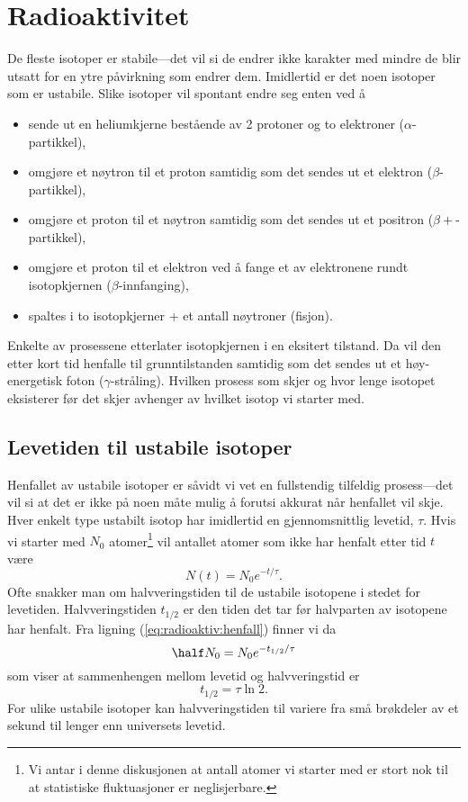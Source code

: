 \chapter{Radioaktivitet}
De fleste isotoper er stabile---det vil si de endrer ikke karakter med mindre de blir utsatt for en ytre påvirkning som endrer dem. Imidlertid er det noen isotoper som er ustabile. Slike isotoper vil spontant endre seg enten ved å
\begin{itemize}
\item
sende ut en heliumkjerne bestående av 2 protoner og to elektroner ($\alpha$-partikkel),
\item
omgjøre et nøytron til et proton samtidig som det sendes ut et elektron ($\beta$-partikkel),
\item
omgjøre et proton til et nøytron samtidig som det sendes ut et positron ($\beta+$-partikkel),
\item
omgjøre et proton til et elektron ved å fange et av elektronene rundt isotopkjernen ($\beta$-innfanging),
\item
spaltes i to isotopkjerner + et antall nøytroner (fisjon).
\end{itemize}
Enkelte av prosessene etterlater isotopkjernen i en eksitert tilstand. Da vil den etter kort tid henfalle til grunntilstanden samtidig som det sendes ut et høy-energetisk foton ($\gamma$-stråling). Hvilken prosess som skjer og hvor lenge isotopet eksisterer før det skjer avhenger av hvilket isotop vi starter med.

\section{Levetiden til ustabile isotoper}
Henfallet av ustabile isotoper er såvidt vi vet en fullstendig tilfeldig prosess---det vil si at det er ikke på noen måte mulig å forutsi akkurat når henfallet vil skje. Hver enkelt type ustabilt isotop har imidlertid en gjennomsnittlig levetid, $\tau$.  Hvis vi starter med $N_0$ atomer\footnote{Vi antar i denne diskusjonen at antall atomer vi starter med er stort nok til at statistiske fluktuasjoner er neglisjerbare.} vil antallet atomer som ikke har henfalt etter tid $t$ være
\begin{equation}
	N(t) = N_0e^{-t/\tau}.
	\label{eq:radioaktiv:henfall}
\end{equation}
Ofte snakker man om halvveringstiden til de ustabile isotopene i stedet for levetiden. Halvveringstiden $t_{1/2}$ er den tiden det tar før halvparten av isotopene har henfalt. Fra ligning (\ref{eq:radioaktiv:henfall}) finner vi da
\begin{displaymath}
	\half N_0 = N_0e^{-t_{1/2}/\tau}
\end{displaymath}
som viser at sammenhengen mellom levetid og halvveringstid er
\begin{equation}
	t_{1/2} = \tau\ln 2.
\end{equation}
For ulike ustabile isotoper kan halvveringstiden til variere fra små brøkdeler av et sekund til lenger enn universets levetid. 

